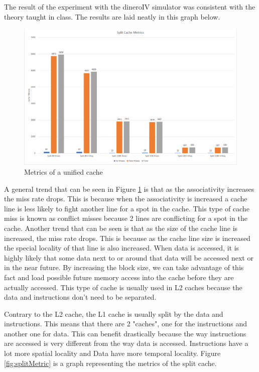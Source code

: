 \documentclass{article}
\begin{document}
        \par
        The result of the experiment with the dineroIV simulator was consistent with the theory taught in class. The results are laid neatly in this graph below.
        \begin{figure}[H]
            \centering
            \label{fig:uniMetric}
            \includegraphics[width=\textwidth]{uni-cache-metrics.png}
            \caption{Metrics of a unified cache}
        \end{figure}
        A general trend that can be seen in Figure \ref{fig:uniMetric} is that as the associativity increases the miss rate drops. This is because when the associativity is increased a cache line is less likely to fight another line for a spot in the cache. This type of cache miss is known as conflict misses because 2 lines are conflicting for a spot in the cache. Another trend that can be seen is that as the size of the cache line is increased, the miss rate drops. This is because as the cache line size is increased the special locality of that line is also increased. When data is accessed, it is highly likely that some data next to or around that data will be accessed next or in the near future. By increasing the block size, we can take advantage of this fact and load possible future memory access into the cache before they are actually accessed. This type of cache is usually used in L2 caches because the data and instructions don’t need to be separated.
        \par
        Contrary to the L2 cache, the L1 cache is usually split by the data and instructions. This means that there are 2 "caches", one for the instructions and another one for data. This can benefit drastically because the way instructions are accessed is very different from the way data is accessed. Instructions have a lot more spatial locality and Data have more temporal locality. Figure \ref{fig:splitMetric} is a graph representing the metrics of the split cache.
\end{document}
